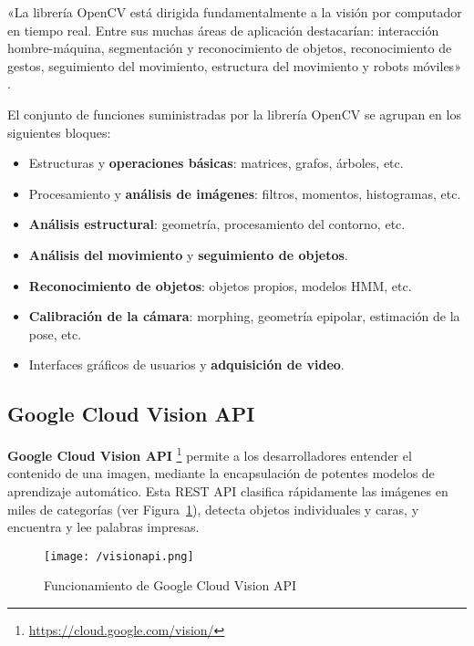 «La librería OpenCV está dirigida fundamentalmente a la visión por computador en tiempo real. Entre sus muchas áreas de aplicación destacarían: interacción hombre-máquina, segmentación y reconocimiento de objetos, reconocimiento de gestos, seguimiento del movimiento, estructura del movimiento y robots móviles» \cite{opencv}.

El conjunto de funciones suministradas por la librería OpenCV se agrupan en los siguientes bloques: 
\begin{itemize}
\item Estructuras y \textbf{operaciones básicas}: matrices, grafos, árboles, etc.
\item Procesamiento y \textbf{análisis de imágenes}: filtros, momentos, histogramas, etc.
\item \textbf{Análisis estructural}: geometría, procesamiento del contorno, etc.
\item \textbf{Análisis del movimiento} y \textbf{seguimiento de objetos}.
\item \textbf{Reconocimiento de objetos}: objetos propios, modelos \acs{HMM}, etc.
\item \textbf{Calibración de la cámara}: morphing, geometría epipolar, estimación de la pose, etc.
\item Interfaces gráficos de usuarios y \textbf{adquisición de video}.
\end{itemize}

\subsection{Google Cloud Vision API}
\label{sec:visionapi}

\textbf{Google Cloud Vision API} \footnote{\url{https://cloud.google.com/vision/}} permite a los desarrolladores entender el contenido de una imagen, mediante la encapsulación de potentes modelos de aprendizaje automático. Esta REST API clasifica rápidamente las imágenes en miles de categorías (ver Figura~\ref{fig:visionapi}), detecta objetos individuales y caras, y encuentra y lee palabras impresas.

\begin{figure}[!h]
\begin{center}
\texttt{[image: /visionapi.png]}
\caption[Funcionamiento de Google Cloud Vision API]{Funcionamiento de Google Cloud Vision API}
\label{fig:visionapi}
\end{center}
\end{figure}

